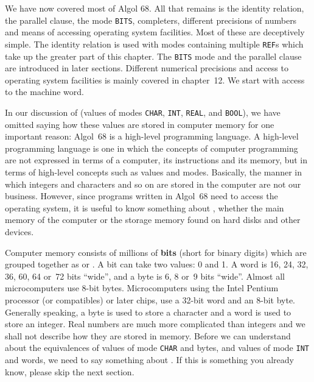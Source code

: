 %
%
%
%
We have now covered most of Algol 68.  All that remains is the
identity relation, the parallel clause, the mode \verb|BITS|,
completers, different precisions of numbers and means of accessing
operating system facilities. Most of these are deceptively simple.
The identity relation is used with modes containing multiple
\verb|REF|s which take up the greater part of this chapter.  The
\verb|BITS| mode and the parallel clause are introduced in later
sections. Different numerical precisions and access to operating
system facilities is mainly covered in chapter~12. We start with
access to the machine word.
\newpage

In our discussion of  (values of
modes \verb|CHAR|, \verb|INT|, \verb|REAL|, and \verb|BOOL|), we have
omitted saying how these values are stored in computer memory for one
important reason: Algol~68 is a high-level programming language. A
high-level programming language is one in which the concepts of
computer programming are not expressed in terms of a computer, its
instructions and its memory, but in terms of high-level concepts such
as values and modes. Basically, the manner in which integers and
characters and so on are stored in the computer are not our business.
However, since programs written in Algol~68 need to access the
operating system, it is useful to know something about ,
whether the main memory of the computer or the storage memory found
on hard disks and other devices.

Computer memory consists of millions of \textbf{bits} (short for binary
digits) which are grouped together as  or .
A bit can take two values: 0 and 1.  A word is 16, 24, 32, 36, 60, 64
or~72 bits ``wide'', and a byte is 6, 8 or~9 bits ``wide''. Almost
all microcomputers use 8-bit bytes.  Microcomputers using the Intel
Pentium processor (or compatibles) or later chips, use a 32-bit word
and an 8-bit byte.  Generally speaking, a byte is used to store a
character and a word is used to store an integer.  Real numbers are
much more complicated than integers and we shall not describe how
they are stored in memory.  Before we can understand about the
equivalences of values of mode \verb|CHAR| and bytes, and values of
mode \verb|INT| and words, we need to say something about
.  If this is
something you already know, please skip the next section.

